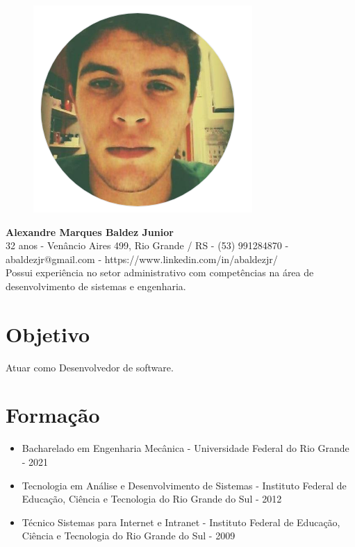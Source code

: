 \documentclass[11pt,oneside,a4paper]{article}
\begin{document}
    \thispagestyle{empty}
    \begin{figure}
        \centering
        \includegraphics[scale = 0.3]{img/perfil-red.png}        
    \end{figure}
    \begin{flushleft}
    \textbf{\Large {Alexandre Marques Baldez Junior}}\\
    \vspace{0.5cm}
    32 anos - Venâncio Aires 499, Rio Grande / RS - (53) 991284870 - abaldezjr@gmail.com - https://www.linkedin.com/in/abaldezjr/\\
    \vspace{0.5cm}
    Possui experiência no setor administrativo com competências na área de desenvolvimento de sistemas e engenharia.\\
    \end{flushleft}    
    \section*{Objetivo}
    Atuar como Desenvolvedor de software.
    \section*{Formação}
    \begin{itemize}
        \item Bacharelado em Engenharia Mecânica - Universidade Federal do Rio Grande - 2021
        \item Tecnologia em Análise e Desenvolvimento de Sistemas - Instituto Federal de Educação, Ciência e Tecnologia do Rio Grande do Sul - 2012
        \item Técnico Sistemas para Internet e Intranet - Instituto Federal de Educação, Ciência e Tecnologia do Rio Grande do Sul - 2009
    \end{itemize}
\end{document}
